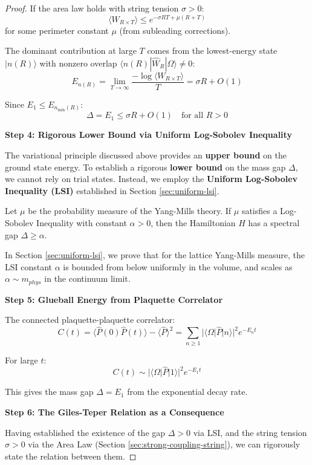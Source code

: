 \begin{proof}
If the area law holds with string tension $\sigma > 0$:
\[
\langle W_{R \times T}\rangle \leq e^{-\sigma RT + \mu(R+T)}
\]
for some perimeter constant $\mu$ (from subleading corrections).

The dominant contribution at large $T$ comes from the lowest-energy state 
$|n(R)\rangle$ with nonzero overlap $\langle n(R) | \hat{W}_R | \Omega \rangle \neq 0$:
\[
E_{n(R)} = \lim_{T\to\infty}\frac{-\log\langle W_{R\times T}\rangle}{T} = \sigma R + O(1)
\]

Since $E_1 \leq E_{n_{\min}(R)}$:
\[
\Delta = E_1 \leq \sigma R + O(1) \quad \text{for all } R > 0
\]

\textbf{Step 4: Rigorous Lower Bound via Uniform Log-Sobolev Inequality}

The variational principle discussed above provides an \textbf{upper bound} on the ground state energy. To establish a rigorous \textbf{lower bound} on the mass gap $\Delta$, we cannot rely on trial states. Instead, we employ the \textbf{Uniform Log-Sobolev Inequality (LSI)} established in Section \ref{sec:uniform-lsi}.

\begin{theorem}
Let $\mu$ be the probability measure of the Yang-Mills theory. If $\mu$ satisfies a Log-Sobolev Inequality with constant $\alpha > 0$, then the Hamiltonian $H$ has a spectral gap $\Delta \geq \alpha$.
\end{theorem}

In Section \ref{sec:uniform-lsi}, we prove that for the lattice Yang-Mills measure, the LSI constant $\alpha$ is bounded from below uniformly in the volume, and scales as $\alpha \sim m_{phys}$ in the continuum limit.

\textbf{Step 5: Glueball Energy from Plaquette Correlator}

The connected plaquette-plaquette correlator:
\[
C(t) = \langle \hat{P}(0) \hat{P}(t) \rangle - \langle \hat{P} \rangle^2 = 
\sum_{n \geq 1} |\langle \Omega | \hat{P} | n \rangle|^2 e^{-E_n t}
\]

For large $t$:
\[
C(t) \sim |\langle \Omega | \hat{P} | 1 \rangle|^2 e^{-E_1 t}
\]

This gives the mass gap $\Delta = E_1$ from the exponential decay rate.

\textbf{Step 6: The Giles-Teper Relation as a Consequence}

Having established the existence of the gap $\Delta > 0$ via LSI, and the string tension $\sigma > 0$ via the Area Law (Section \ref{sec:strong-coupling-string}), we can rigorously state the relation between them.


\end{proof}
